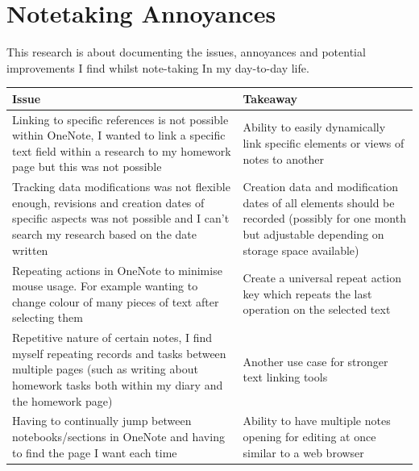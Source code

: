 \section{Notetaking Annoyances}
\label{research:NotetakingAnnoyances}
This research is about documenting the issues, annoyances and potential improvements I find whilst note-taking In my day-to-day life.

\begin{tabularx}{\textwidth}{XX}
    \toprule

    \textbf{Issue} & \textbf{Takeaway}

    \\
    \midrule

    Linking to specific references is not possible within OneNote, I wanted to link a specific text field within a research to my homework page but this was not possible
                   &
    Ability to easily dynamically link specific elements or views of notes to another \\

    Tracking data modifications was not flexible enough, revisions and creation dates of specific aspects was not possible and I can't search my research based on the date written
                   &
    Creation data and modification dates of all elements should be recorded (possibly for one month but adjustable depending on storage space available)

    \\
    Repeating actions in OneNote to minimise mouse usage. For example wanting to change colour of many pieces of text after selecting them
                   &
    Create a universal repeat action key which repeats the last operation on the selected text

    \\

    Repetitive nature of certain notes, I find myself repeating records and tasks between multiple pages (such as writing about homework tasks both within my diary and the homework page)
                   &
    Another use case for stronger text linking tools

    \\



    Having to continually jump between notebooks/sections in OneNote and having to find the page I want each time

                   &
    Ability to have multiple notes opening for editing at once similar to a web browser


    \\
    \bottomrule
\end{tabularx}


